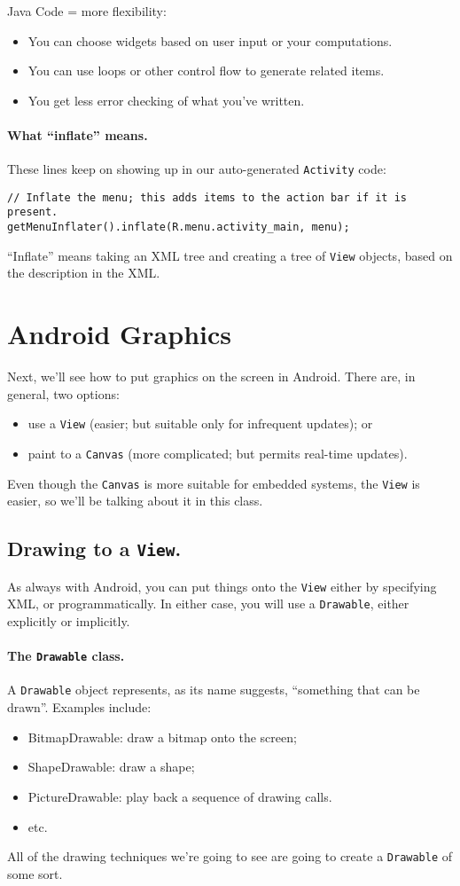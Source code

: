 Java Code = more flexibility:
\begin{itemize}
\item You can choose widgets based on user input or your computations.
\item You can use loops or other control flow to generate related items.
\item You get less error checking of what you've written.
\end{itemize}

\paragraph{What ``inflate'' means.}
These lines keep on showing up in our auto-generated {\tt Activity} code:
{
\begin{verbatim}
// Inflate the menu; this adds items to the action bar if it is present.
getMenuInflater().inflate(R.menu.activity_main, menu);
\end{verbatim}
}

``Inflate'' means taking an XML tree and creating a tree of {\tt View}
objects, based on the description in the XML.

\section*{Android Graphics}
Next, we'll see how to put graphics on the screen in Android. 
There are, in general, two options:
\begin{itemize}
\item use a {\tt View} (easier; but suitable only for infrequent updates); or
\item paint to a {\tt Canvas} (more complicated; but permits real-time updates).
\end{itemize}
Even though the {\tt Canvas} is more suitable for embedded systems, 
the {\tt View} is easier, so we'll be talking about it in this class.

\subsection*{Drawing to a {\tt View}.} 
As always with Android, you can put things onto the {\tt View} either 
by specifying XML, or programmatically. In either case, you will use
a {\tt Drawable}, either explicitly or implicitly.

\paragraph{The {\tt Drawable} class.}
A {\tt Drawable} object represents, as its name suggests, 
``something that can be drawn''. Examples include:
\begin{itemize}
\item BitmapDrawable: draw a bitmap onto the screen;
\item ShapeDrawable: draw a shape;
\item PictureDrawable: play back a sequence of drawing calls.
\item etc.
\end{itemize}
All of the drawing techniques we're going to see are going
to create a {\tt Drawable} of some sort.

